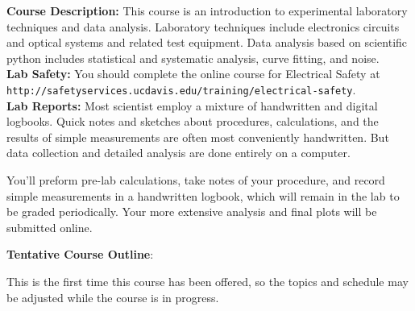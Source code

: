 \documentclass[12pt]{article}
\begin{document}
\noindent
\textbf {Course Description:}  This course is an introduction to experimental laboratory techniques and data analysis.  Laboratory techniques include electronics circuits and optical systems and related test equipment.  Data analysis based on scientific python includes statistical and systematic analysis, curve fitting, and noise.\\

\noindent
\textbf {Lab Safety:} 
You should complete the online course for Electrical Safety at \\
{\tt http://safetyservices.ucdavis.edu/training/electrical-safety}.\\

\noindent
\textbf {Lab Reports:} 
Most scientist employ a mixture of handwritten and digital logbooks.  Quick notes and sketches about procedures, calculations, and the results of simple measurements are often most conveniently handwritten.  But data collection and detailed analysis are done entirely on a computer.

You'll preform pre-lab calculations, take notes of your procedure, and record simple measurements in a handwritten logbook, which will remain in the lab to be graded periodically.  Your more extensive analysis and final plots will be submitted online.

\vskip 0.5cm
\noindent
\textbf {Tentative Course Outline}:

This is the first time this course has been offered, so the topics and schedule may be adjusted while the course is in progress.
\end{document}
